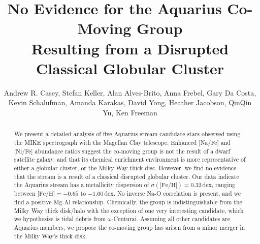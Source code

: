 \documentclass{emulateapj}
\begin{document}
\title{No Evidence for the Aquarius Co-Moving Group \\Resulting from a Disrupted Classical Globular Cluster}



\author{Andrew R. Casey, Stefan Keller, Alan Alves-Brito, Anna Frebel, Gary Da Costa, Kevin Schalufman, Amanda Karakas, David Yong, Heather Jacobson, QinQin Yu, Ken Freeman}


\begin{abstract}
We present a detailed analysis of five Aquarius stream candidate stars observed using the MIKE spectrograph with the Magellan Clay telescope.  Enhanced [Na/Fe] and [Ni/Fe] abundance ratios suggest the co-moving group is not the result of a dwarf satellite galaxy, and that its chemical enrichment environment is more representative of either a globular cluster, or the Milky Way thick disc. However, we find no evidence that the stream is a result of a classical disrupted globular cluster. Our data indicate the Aquarius stream has a  metallicity dispersion of $\sigma(\mbox{[Fe/H}]) = 0.32$\,dex, ranging between $\mbox{[Fe/H]} = -0.65$ to $-1.60$\,dex. No inverse Na-O correlation is present, and we find a positive Mg-Al relationship. Chemically, the group is indistinguishable from the Milky Way thick disk/halo with the exception of one very interesting candidate, which we hypothesise is tidal debris from $\omega$-Centurai. Assuming all other candidates are Aquarius members, we propose the co-moving group has arisen from a minor merger in the Milky Way's thick disk.

\end{abstract}
\end{document}
